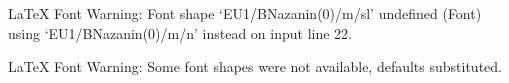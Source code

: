 
LaTeX Font Warning: Font shape `EU1/BNazanin(0)/m/sl' undefined
(Font)              using `EU1/BNazanin(0)/m/n' instead on input line 22.


LaTeX Font Warning: Some font shapes were not available, defaults substituted.

